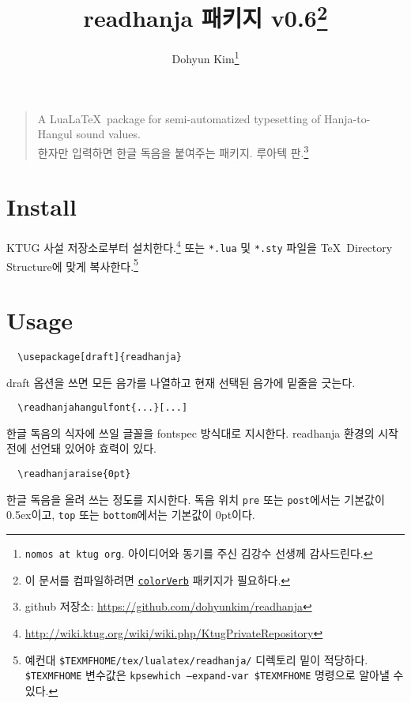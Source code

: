 \documentclass[a4paper,12pt]{article}
\begin{document}
\title{\ttfamily readhanja 패키지 v0.6\thanks{이 문서를 컴파일하려면
    \href{https://gist.github.com/dohyunkim/5f2dc71b1ff85adb3978}{\texttt{colorVerb}}
    패키지가 필요하다.
}}
\author{Dohyun Kim\thanks{\texttt{nomos at ktug org}.
  아이디어와 동기를 주신 김강수 선생께 감사드린다.}}
\maketitle

\begin{quote}
A Lua\LaTeX\ package for semi-automatized typesetting of
Hanja-to-Hangul sound values.\\
한자만 입력하면 한글 독음을 붙여주는 패키지. 루아텍 판.\footnote{
  github 저장소: \url{https://github.com/dohyunkim/readhanja}}
\end{quote}

\section*{Install}

KTUG 사설 저장소로부터 설치한다.\footnote{
  \url{http://wiki.ktug.org/wiki/wiki.php/KtugPrivateRepository}}
또는
\verb|*.lua| 및 \verb|*.sty| 파일을 \TeX\ Directory Structure에 맞게 복사한다.\footnote{
  예컨대 \texttt{\$TEXMFHOME/tex/lualatex/readhanja/} 디렉토리 밑이 적당하다.
  \texttt{\$TEXMFHOME} 변수값은 \texttt{kpsewhich --expand-var \string\$TEXMFHOME}
  명령으로 알아낼 수 있다.
}

\section*{Usage}

\begin{verbatim}
  \usepackage[draft]{readhanja}
\end{verbatim}
draft 옵션을 쓰면 모든 음가를 나열하고 현재 선택된 음가에
밑줄을 긋는다.

\begin{verbatim}
  \readhanjahangulfont{...}[...]
\end{verbatim}
한글 독음의 식자에 쓰일 글꼴을 fontspec 방식대로 지시한다.
readhanja 환경의 시작 전에 선언돼 있어야 효력이 있다.

\begin{verbatim}
  \readhanjaraise{0pt}
\end{verbatim}
한글 독음을 올려 쓰는 정도를 지시한다.
독음 위치 \verb|pre| 또는 \verb|post|에서는 기본값이 0.5ex이고,
\verb|top| 또는 \verb|bottom|에서는 기본값이 0pt이다.
\end{document}
